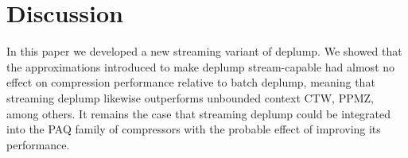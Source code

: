 \section{Discussion}
\label{sec:discussion}

In this paper we developed a new streaming variant of deplump.  We showed that the approximations introduced to make deplump stream-capable had almost no effect on compression performance relative to batch deplump, meaning that streaming deplump likewise outperforms unbounded context CTW, PPMZ, among others.  It remains the case that streaming deplump could be integrated into the PAQ family of compressors with the probable effect of improving its performance. 

